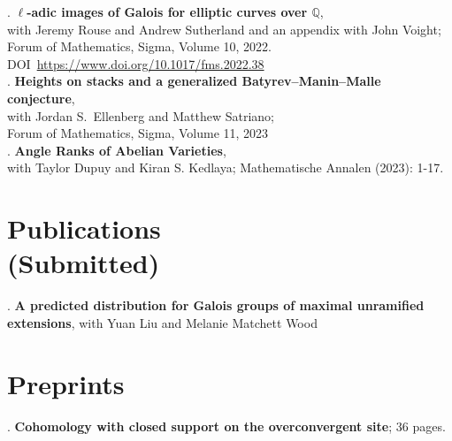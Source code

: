 \documentclass[margin,line]{res}
\newcounter{pubs}
\begin{document}
\begin{resume}
 .  \textbf{$\ell$-adic images of Galois for elliptic curves over $\mathbb{Q}$},\\
with Jeremy Rouse and Andrew Sutherland and an appendix with John Voight;\\
Forum of Mathematics, Sigma, Volume 10, 2022. DOI~\url{https://www.doi.org/10.1017/fms.2022.38}
\medskip\\
 .  \textbf{Heights on stacks and a generalized Batyrev--Manin--Malle conjecture},\\
with Jordan S.~Ellenberg and Matthew Satriano;\\
Forum of Mathematics, Sigma, Volume 11, 2023
\medskip\\
 .  \textbf{Angle Ranks of Abelian Varieties},\\ with Taylor Dupuy and Kiran S. Kedlaya; Mathematische Annalen (2023): 1-17.



\vspace{-7pt}
\section{\sc Publications \\ {(Submitted)}}



 .  \textbf{A predicted distribution for Galois groups of maximal unramified extensions}, with Yuan Liu and Melanie Matchett Wood



\section{\sc Preprints}
 .  \textbf{Cohomology with closed support on the overconvergent site}; 36 pages. \vspace{.48cm}\\


\end{resume}
\end{document}

